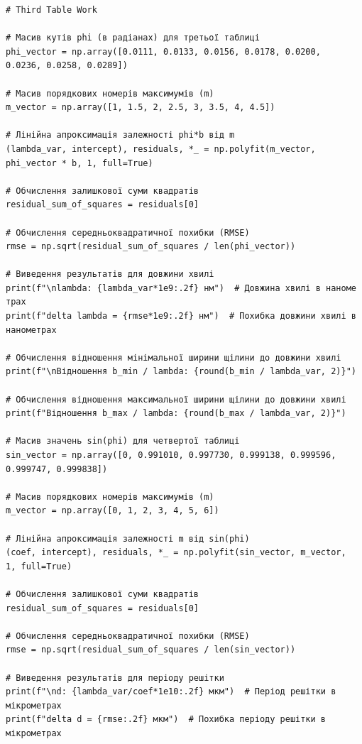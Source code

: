 \documentclass[12pt,a4paper]{article}
\begin{document}
{\begin{verbatim}
# Third Table Work

# Масив кутів phi (в радіанах) для третьої таблиці
phi_vector = np.array([0.0111, 0.0133, 0.0156, 0.0178, 0.0200,
0.0236, 0.0258, 0.0289])

# Масив порядкових номерів максимумів (m)
m_vector = np.array([1, 1.5, 2, 2.5, 3, 3.5, 4, 4.5])

# Лінійна апроксимація залежності phi*b від m
(lambda_var, intercept), residuals, *_ = np.polyfit(m_vector,
phi_vector * b, 1, full=True)

# Обчислення залишкової суми квадратів
residual_sum_of_squares = residuals[0]

# Обчислення середньоквадратичної похибки (RMSE)
rmse = np.sqrt(residual_sum_of_squares / len(phi_vector))

# Виведення результатів для довжини хвилі
print(f"\nlambda: {lambda_var*1e9:.2f} нм")  # Довжина хвилі в наноме
трах
print(f"delta lambda = {rmse*1e9:.2f} нм")  # Похибка довжини хвилі в
нанометрах

# Обчислення відношення мінімальної ширини щілини до довжини хвилі
print(f"\nВідношення b_min / lambda: {round(b_min / lambda_var, 2)}")

# Обчислення відношення максимальної ширини щілини до довжини хвилі
print(f"Відношення b_max / lambda: {round(b_max / lambda_var, 2)}")

# Масив значень sin(phi) для четвертої таблиці
sin_vector = np.array([0, 0.991010, 0.997730, 0.999138, 0.999596,
0.999747, 0.999838])

# Масив порядкових номерів максимумів (m)
m_vector = np.array([0, 1, 2, 3, 4, 5, 6])

# Лінійна апроксимація залежності m від sin(phi)
(coef, intercept), residuals, *_ = np.polyfit(sin_vector, m_vector,
1, full=True)

# Обчислення залишкової суми квадратів
residual_sum_of_squares = residuals[0]

# Обчислення середньоквадратичної похибки (RMSE)
rmse = np.sqrt(residual_sum_of_squares / len(sin_vector))

# Виведення результатів для періоду решітки
print(f"\nd: {lambda_var/coef*1e10:.2f} мкм")  # Період решітки в
мікрометрах
print(f"delta d = {rmse:.2f} мкм")  # Похибка періоду решітки в
мікрометрах
\end{verbatim}
}
\end{document}
